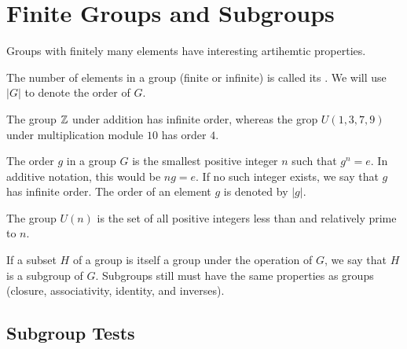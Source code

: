 \documentclass[12pt]{scrartcl}
\begin{document}
\section{Finite Groups and Subgroups}

Groups with finitely many elements have interesting artihemtic properties. 

\begin{definition}
  The number of elements in a group (finite or infinite) is called its . We will use 
  $|G|$ to denote the order of $G$.
\end{definition}

\begin{example}
  The group $\mathbb Z$ under addition has infinite order, whereas the grop $U(1, 3, 7, 9)$ under multiplication module $10$ has order $4$. 
\end{example}

\begin{definition}
  The order $g$ in a group $G$ is the smallest positive integer $n$ such that $g^n = e$. 
  In additive notation, this would be $ng = e$. If no such integer exists, we say that $g$ has infinite order. 
  The order of an element $g$ is denoted by $|g|$. 
\end{definition}

\begin{note}
The group $U(n)$ is the set of all positive integers less than and relatively prime to $n$. 
\end{note}

\begin{definition}[Subgroup]
  If a subset $H$ of a group is itself a group under the operation of $G$, we say that $H$ is a subgroup of $G$. 
  Subgroups still must have the same properties as groups (closure, associativity, identity, and inverses). 
\end{definition}

\subsection{Subgroup Tests}
\end{document}
